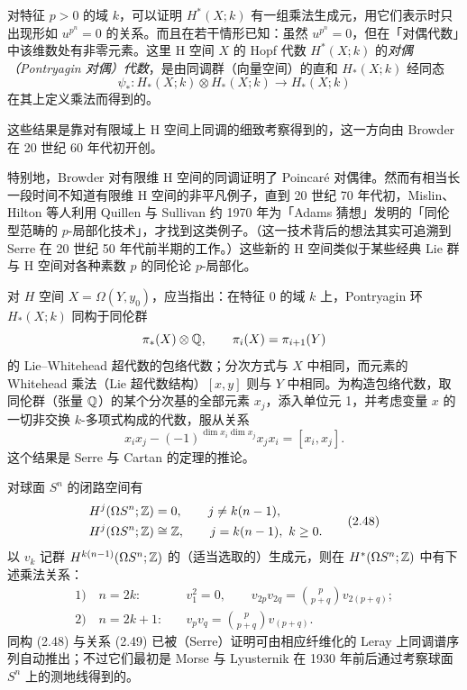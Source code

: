 对特征 $p>0$ 的域 $k$，可以证明 $H^*(X;k)$ 有一组乘法生成元，用它们表示时只出现形如 $u^{p^n}=0$ 的关系。而且在若干情形已知：虽然 $u^{p^n}=0$，但在「对偶代数」中该维数处有非零元素。这里 H 空间 $X$ 的 Hopf 代数 $H^*(X;k)$ 的\emph{对偶（Pontryagin 对偶）代数}，是由同调群（向量空间）的直和 $H_*(X;k)$ 经同态
\[
  \psi_*:H_*(X;k)\otimes H_*(X;k)\to H_*(X;k)
\]
在其上定义乘法而得到的。

这些结果是靠对有限域上 H 空间上同调的细致考察得到的，这一方向由 Browder 在 20 世纪 60 年代初开创。

特别地，Browder 对有限维 H 空间的同调证明了 Poincaré 对偶律。然而有相当长一段时间不知道有限维 H 空间的非平凡例子，直到 20 世纪 70 年代初，Mislin、Hilton 等人利用 Quillen 与 Sullivan 约 1970 年为「Adams 猜想」发明的「同伦型范畴的 $p$-局部化技术」，才找到这类例子。（这一技术背后的想法其实可追溯到 Serre 在 20 世纪 50 年代前半期的工作。）这些新的 H 空间类似于某些经典 Lie 群与 H 空间对各种素数 $p$ 的同伦论 $p$-局部化。

对 $H$ 空间 $X=\Omega(Y,y_0)$，应当指出：在特征 0 的域 $k$ 上，Pontryagin 环 $H_*(X;k)$ 同构于同伦群
\[
  \pi_*(X)\otimes\mathbb{Q},\qquad \pi_i(X)=\pi_{i+1}(Y)
\]
的 Lie--Whitehead 超代数的包络代数；分次方式与 $X$ 中相同，而元素的 Whitehead 乘法（Lie 超代数结构）$[x,y]$ 则与 $Y$ 中相同。为构造包络代数，取同伦群（张量 $\mathbb{Q}$）的某个分次基的全部元素 $x_j$，添入单位元 1，并考虑变量 $x$ 的一切非交换 $k$-多项式构成的代数，服从关系
\[
  x_ix_j-(-1)^{\dim x_i\dim x_j}x_jx_i=[x_i,x_j].
\]
这个结果是 Serre 与 Cartan 的定理的推论。

\begin{example}{}
对球面 $S^n$ 的闭路空间有
\begin{equation}
\begin{aligned}
  H^j(\Omega S^n;\mathbb{Z})&=0,\qquad j\ne k(n-1),\\
  H^j(\Omega S^n;\mathbb{Z})&\cong\mathbb{Z},\qquad j=k(n-1),\ k\ge0.
\end{aligned}\tag{2.48}
\end{equation}
以 $v_k$ 记群 $H^{k(n-1)}(\Omega S^n;\mathbb{Z})$ 的（适当选取的）生成元，则在 $H^*(\Omega S^n;\mathbb{Z})$ 中有下述乘法关系：
\begin{equation}
\begin{aligned}
  1)\quad n=2k:\quad & v_1^2=0,\qquad
  v_{2p}v_{2q}=\binom{p}{p+q}v_{2(p+q)};\\
  2)\quad n=2k+1:\quad & v_pv_q=\binom{p}{p+q}v_{(p+q)}.
\end{aligned}\tag{2.49}
\end{equation}
同构 (2.48) 与关系 (2.49) 已被（Serre）证明可由相应纤维化的 Leray 上同调谱序列自动推出；不过它们最初是 Morse 与 Lyusternik 在 1930 年前后通过考察球面 $S^n$ 上的测地线得到的。
\end{example}

